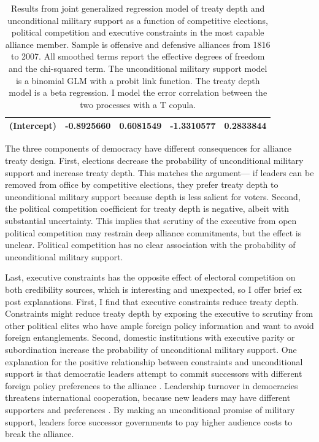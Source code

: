 \documentclass[12pt]{article}
\begin{document}
\begin{table}[ht]
\begin{tabular}{lrrrr}
  (Intercept) & -0.8925660 & 0.6081549 & -1.3310577 & 0.2833844 \\
   \hline
\end{tabular}
\caption{Results from joint generalized regression model of treaty depth and unconditional military support as a function of competitive elections, political competition and executive constraints in the most capable alliance member.
              Sample is offensive and defensive alliances from 1816 to 2007.  
                     All smoothed terms report the effective degrees of freedom and the chi-squared term. 
                     The unconditional military support model is a binomial GLM with a probit link function. 
                     The treaty depth model is a beta regression. 
                     I model the error correlation between the two processes with a T copula.} 
\label{tab:gjrm-res-split}
\end{table}


The three components of democracy have different consequences for alliance treaty design.
First, elections decrease the probability of unconditional military support and increase treaty depth.
This matches the argument--- if leaders can be removed from office by competitive elections, they prefer treaty depth to unconditional military support because depth is less salient for voters. 
Second, the political competition coefficient for treaty depth is negative, albeit with substantial uncertainty. 
This implies that scrutiny of the executive from open political competition may restrain deep alliance commitments, but the effect is unclear. 
Political competition has no clear association with the probability of unconditional military support. 


Last, executive constraints has the opposite effect of electoral competition on both credibility sources, which is interesting and unexpected, so I offer brief ex post explanations.
First, I find that executive constraints reduce treaty depth.  
Constraints might reduce treaty depth by exposing the executive to scrutiny from other political elites who have ample foreign policy information and want to avoid foreign entanglements.  
Second, domestic institutions with executive parity or subordination increase the probability of unconditional military support.  
One explanation for the positive relationship between constraints and unconditional support is that democratic leaders attempt to commit successors with different foreign policy preferences to the alliance \cite{Mattes2012a}. 
Leadership turnover in democracies threatens international cooperation, because new leaders may have different supporters and preferences \citep{Lobell2004, Narizny2007, Leedsetal2009}. 
By making an unconditional promise of military support, leaders force successor governments to pay higher audience costs to break the alliance. 
\end{document}
